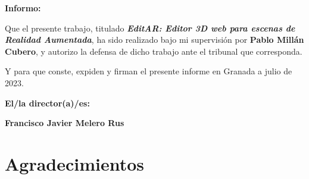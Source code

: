 \textbf{Informo:}

\vspace{0.5cm}

Que el presente trabajo, titulado \textit{\textbf{EditAR: Editor 3D web para escenas de Realidad Aumentada}},
ha sido realizado bajo mi supervisión por \textbf{Pablo Millán Cubero}, y autorizo la defensa de dicho trabajo ante el tribunal
que corresponda.

\vspace{0.5cm}

Y para que conste, expiden y firman el presente informe en Granada a julio de 2023.

\vspace{1cm}

\textbf{El/la director(a)/es: }

\vspace{5cm}

\noindent \textbf{Francisco Javier Melero Rus}

\chapter*{Agradecimientos}




